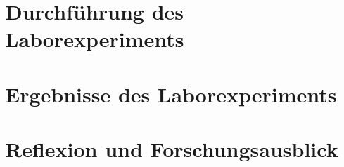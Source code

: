 \documentclass[a4paper,fontsize=11pt,oneside,parskip=half,headings=normal]{scrreprt}
\begin{document}



% 

\begin{spacing}{1}

  \tableofcontents
  \clearpage

  
  \clearpage

  \thispagestyle{kapitelkopfzeile}

  \listoffigures

  \clearpage

  \listoftables

  \cleardoublepage

\end{spacing}





\chapter{Durchführung des Laborexperiments}
\chapter{Ergebnisse des Laborexperiments}
\chapter{Reflexion und Forschungsausblick}

%
\clearpage

% 
% 
% 




\literaturverzeichnis
\cleardoublepage


\end{document}
